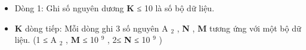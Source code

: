 \begin{itemize}
	\item Dòng 1: Ghi số nguyên dương \textbf{ K } ≤ 10 là số bộ dữ liệu.
	\item \textbf{K } dòng tiếp: Mỗi dòng ghi 3 số nguyên A $_ 2 $ , \textbf{ N } , \textbf{ M } tương ứng với một bộ dữ liệu. (1 ≤ A $_ 2 $ , \textbf{ M } ≤ 10 $^ 9 $ , 2≤ \textbf{ N } ≤ 10 $^ 9 $ )
\end{itemize}